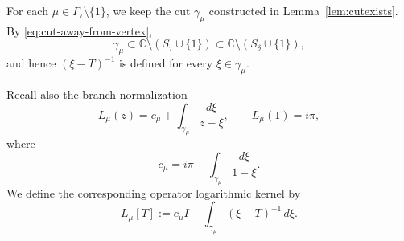 \documentclass[11pt]{amsart}
\numberwithin{equation}{section}
\theoremstyle{definition}
\theoremstyle{plain}
\begin{document}

For each \(\mu\in\Gamma_\tau\setminus\{1\}\), we keep the cut
\(\gamma_\mu\) constructed in Lemma~\ref{lem:cutexists}.  By
\eqref{eq:cut-away-from-vertex},
\[
        \gamma_\mu
        \subset
        \mathbb C\setminus(S_\tau\cup\{1\})
        \subset
        \mathbb C\setminus(S_\delta\cup\{1\}),
\]
and hence \((\xi-T)^{-1}\) is defined for every
\(\xi\in\gamma_\mu\).


 Recall also the
branch normalization
\[
        L_\mu(z)=c_\mu+\int_{\gamma_\mu}\frac{d\xi}{z-\xi},
        \qquad
        L_\mu(1)=i\pi,
\]
where
\[
        c_\mu=i\pi-\int_{\gamma_\mu}\frac{d\xi}{1-\xi}.
\]
We define the corresponding operator logarithmic kernel by
\begin{equation}\label{eq:LmuT-cut-definition}
        L_\mu[T]:=
        c_\mu I-\int_{\gamma_\mu}(\xi-T)^{-1}\,d\xi .
\end{equation}

\end{document}

